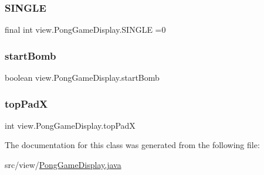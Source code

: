 \subsubsection{\texorpdfstring{S\+I\+N\+G\+LE}{SINGLE}}
{\footnotesize\ttfamily final int view.\+Pong\+Game\+Display.\+S\+I\+N\+G\+LE =0\hspace{0.3cm}{\ttfamily [private]}}

\hypertarget{classview_1_1_pong_game_display_a4acf14f2571c372dd4737fac2b8d7412}{}\label{classview_1_1_pong_game_display_a4acf14f2571c372dd4737fac2b8d7412} 
\subsubsection{\texorpdfstring{start\+Bomb}{startBomb}}
{\footnotesize\ttfamily boolean view.\+Pong\+Game\+Display.\+start\+Bomb\hspace{0.3cm}{\ttfamily [private]}}

\hypertarget{classview_1_1_pong_game_display_a808ad12c167de880ca74e5ad56ea5f43}{}\label{classview_1_1_pong_game_display_a808ad12c167de880ca74e5ad56ea5f43} 
\subsubsection{\texorpdfstring{top\+PadX}{topPadX}}
{\footnotesize\ttfamily int view.\+Pong\+Game\+Display.\+top\+PadX\hspace{0.3cm}{\ttfamily [private]}}



The documentation for this class was generated from the following file\+:\begin{DoxyCompactItemize}
\item 
src/view/\hyperlink{_pong_game_display_8java}{Pong\+Game\+Display.\+java}\end{DoxyCompactItemize}
